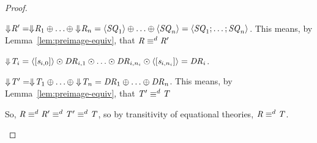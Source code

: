 \documentclass[numbers,10pt,preprint\ifanon ,nocopyrightspace\fi]{sigplanconf}
\begin{document}
\begin{proof}
\begin{case}[\ParallelSwapDNFStructuralRewriteRule{}]
    $\Downarrow\mkern-4mu \mathit{R}' =
    \Downarrow\mkern-4mu \mathit{R}_1 \oplus \ldots \oplus \Downarrow\mkern-4mu \mathit{R}_n =
    \langle\mathit{SQ}_1\rangle \oplus \ldots \oplus \langle\mathit{SQ}_n\rangle =
    \langle\mathit{SQ}_1 ; \ldots ; \mathit{SQ}_n\rangle$.
    This means, by Lemma~\ref{lem:preimage-equiv}, that
    $\mathit{R} \equiv^d \mathit{R}'$

    $\Downarrow\mkern-4mu \mathit{T}_i =
    \langle[\mathit{s}_{i,0}]\rangle \odot \mathit{DR}_{i,1}
    \odot \ldots \odot \mathit{DR}_{i,n_i} \odot
    \langle[\mathit{s}_{i,n_i}]\rangle =
    \mathit{DR}_i$.

    $\Downarrow\mkern-4mu \mathit{T}' =
    \Downarrow\mkern-4mu \mathit{T}_1 \oplus \ldots \oplus \Downarrow\mkern-4mu \mathit{T}_n =
    \mathit{DR}_1 \oplus \ldots \oplus \mathit{DR}_n$.
    This means, by Lemma~\ref{lem:preimage-equiv}, that
    $\mathit{T}' \equiv^d \mathit{T}$
    
    So, $\mathit{R} \equiv^d \mathit{R}' \equiv^d \mathit{T}'
    \equiv^d \mathit{T}$, so by transitivity of equational theories,
    $\mathit{R} \equiv^d \mathit{T}$.
  \end{case}
\end{proof}
\end{document}
